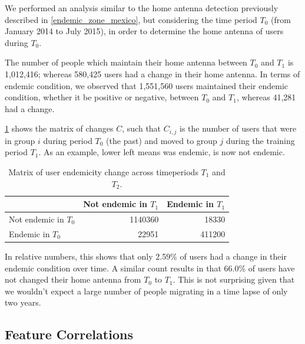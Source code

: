 We performed an analysis similar to the home antenna detection previously described in \cref{endemic_zone_mexico}, but considering the time period $T_0$ (from January 2014 to July 2015),
in order to determine the home antenna of users during $T_0$.

The number of people which maintain their home antenna between $T_0$ and $T_1$ is 1,012,416;
whereas 580,425 users had a change in their home antenna.
In terms of endemic condition, we observed that 1,551,560 users maintained their endemic condition, whether it be positive or negative, between $T_0$ and $T_1$, whereas 41,281 had a change.


%
%
%

\cref{tab:changes}
shows the matrix of changes $C$, such that $C_{i, j}$ is the number of users that were in group $i$ during period $T_0$ (the past) and moved to group $j$ during the training period $T_1$.
As an example, lower left means was endemic, is now not endemic.

\begin{table}[ht]
	\caption{Matrix of user endemicity change across timeperiods $T_1$ and $T_2$.}\label{tab:changes}
	\centering
	\begin{tabular}{l r r }
		\toprule
		& Not endemic in $T_1$ & Endemic in $T_1$ \\
		\midrule
		Not endemic in $T_0$ & 1140360 & 18330   \\
		Endemic in $T_0$       & 22951    & 411200 \\
		\bottomrule
	\end{tabular}
\end{table}

In relative numbers, this shows that only 2.59\% of users had a change in their endemic condition over time.
A similar count results in that 66.0\% of users have not changed their home antenna from $T_0$ to $T_1$.
This is not surprising given that we wouldn't expect a large number of people migrating in a time lapse of only two years.



\subsection{Feature Correlations}
\label{subsection:feature_correlations} %


